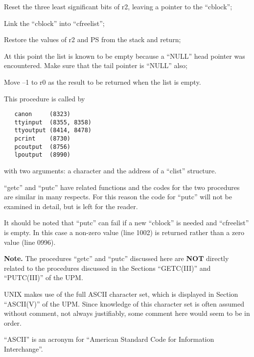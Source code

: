 \item[0953:] Reset the three least significant
bits of r2, leaving a pointer to
the ``cblock'';

\item[0954:] Link the ``cblock'' into ``cfreelist'';

\item[0957:] Restore the values of r2 and PS
from the stack and return;

\item[0961:] At this point the list is known
to be empty because a ``NULL'' head
pointer was encountered. Make
sure that the tail pointer is
``NULL'' also;

\item[0962:] Move --1 to r0 as the result to be
returned when the list is empty.
\ed


This procedure is called by

\begin{verbatim}
   canon     (8323)
   ttyinput  (8355, 8358)
   ttyoutput (8414, 8478)
   pcrint    (8730)
   pcoutput  (8756)
   lpoutput  (8990)
\end{verbatim}

\noindent with two arguments: a character and the
address of a ``clist'' structure.

``getc'' and ``putc'' have related functions and
the codes for the two procedures are similar in many respects.
For this reason the code for ``putc''
will not be examined in detail, but is
left for the reader.

It should be noted that ``putc'' can fail
if a new ``cblock'' is needed and
``cfreelist'' is empty. In this case a
non-zero value (line 1002) is returned
rather than a zero value (line 0996).

{\bf Note.} The procedures ``getc'' and ``putc''
discussed here are {\bf NOT} directly related
to the procedures discussed in the Sections
``GETC(III)'' and ``PUTC(III)'' of the UPM.


UNIX makes use of the full ASCII character set,
which is displayed in Section ``ASCII(V)'' of the UPM. Since
knowledge of this character set is
often assumed without comment, not
always justifiably, some comment here
would seem to be in order.

``ASCII'' is an acronym for ``American
Standard Code for Information Interchange''.


